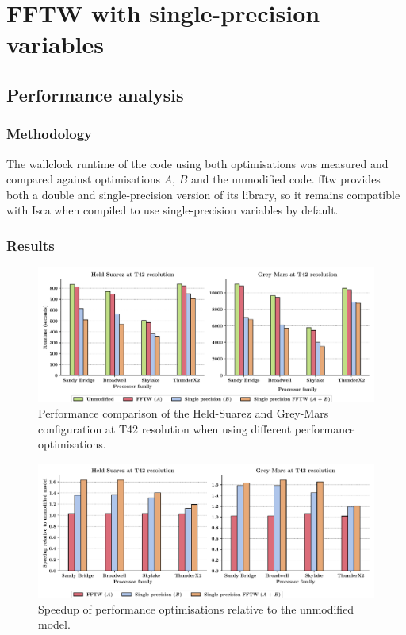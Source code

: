 \documentclass[a4paper,11pt]{report}
\begin{document}
\section{FFTW with single-precision variables}

\subsection{Performance analysis}

\subsubsection{Methodology}
The wallclock runtime of the code using both optimisations was measured and compared against optimisations $A$, $B$ and the unmodified code. \gls{fftw} provides both a double and single-precision version of its library, so it remains compatible with Isca when compiled to use single-precision variables by default.
\subsubsection{Results}
\begin{figure}[H]
\begin{center}
\includegraphics[width=\textwidth]{img/opt_comparison.pdf}
\caption[Runtimes of all optimisations]{Performance comparison of the Held-Suarez and Grey-Mars configuration at T42 resolution when using different performance optimisations.}
\label{fig:opt-comparison}
\end{center}
\end{figure}

\begin{figure}[H]
\begin{center}
\includegraphics[width=\textwidth]{img/speedup-opt.pdf}
\caption{Speedup of performance optimisations relative to the unmodified model.}
\label{fig:opt-comparison}
\end{center}
\end{figure}
\end{document}
